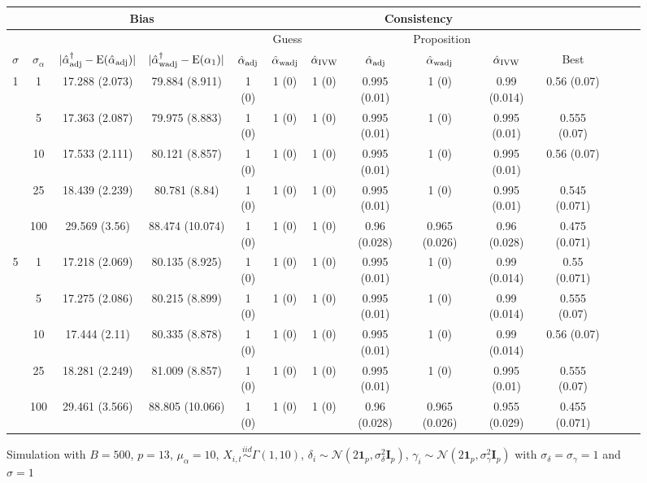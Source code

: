 \documentclass[10pt]{article}
\newcommand{\simiid}{\stackrel{iid}{\sim}} %
\def\normal#1#2{\mathcal{N}(#1,#2)} %
\def\E#1{\mathrm{E}(#1)} %
\theoremstyle{definition}
\begin{document}
\begin{sidewaysfigure}
\centering
\caption{Simulation  with $B = 500$, $p = 13$, $\mu_{\alpha}=10$, $X_{i,t} \simiid \Gamma(1,10)$, $\delta_i \sim \normal{2\mathbf{1}_p}{\sigma^2_{\delta}\mathbf{I}_p}$, $\gamma_i \sim \normal{2\mathbf{1}_p}{\sigma^2_{\gamma}\mathbf{I}_p}$ with $\sigma_{\delta}=\sigma_{\gamma}=1$ and $\sigma = 1$}
\begin{tabular}{cc|cc|ccc|ccc|ccc|c}
  & & \multicolumn{2}{c|}{Bias}  & \multicolumn{7}{c}{Consistency}  \\ 
  \hline 
   &  & & & \multicolumn{3}{|c|}{Guess} & \multicolumn{3}{|c|}{Proposition} & \\ 
 $\sigma$   & $\sigma_{\alpha}$ & $|\hat{\alpha}_{\rm adj}^{\dagger}-\E{\hat{\alpha}_{\rm adj}}|$ & $|\hat{\alpha}_{\rm wadj}^{\dagger}-\E{\alpha_1}|$ & $\hat{\alpha}_{\rm adj}$  & $\hat{\alpha}_{\rm wadj}$ & $\hat{\alpha}_{\rm IVW}$ & $\hat{\alpha}_{\rm adj}$  & $\hat{\alpha}_{\rm wadj}$ & $\hat{\alpha}_{\rm IVW}$ &  Best \\[.3cm]  
  \hline
 \multirow{5}{*}{1} & 1 & 17.288 (2.073) & 79.884 (8.911) & 1 (0) & 1 (0) & 1 (0) & 0.995 (0.01) & 1 (0) & 0.99 (0.014) & 0.56 (0.07) \\ 
 & 5 & 17.363 (2.087) & 79.975 (8.883) & 1 (0) & 1 (0) & 1 (0) & 0.995 (0.01) & 1 (0) & 0.995 (0.01) & 0.555 (0.07) \\ 
 & 10 & 17.533 (2.111) & 80.121 (8.857) & 1 (0) & 1 (0) & 1 (0) & 0.995 (0.01) & 1 (0) & 0.995 (0.01) & 0.56 (0.07) \\ 
 & 25 & 18.439 (2.239) & 80.781 (8.84) & 1 (0) & 1 (0) & 1 (0) & 0.995 (0.01) & 1 (0) & 0.995 (0.01) & 0.545 (0.071) \\ 
 & 100 & 29.569 (3.56) & 88.474 (10.074) & 1 (0) & 1 (0) & 1 (0) & 0.96 (0.028) & 0.965 (0.026) & 0.96 (0.028) & 0.475 (0.071) \\[.3cm]  
  \multirow{5}{*}{5} & 1 & 17.218 (2.069) & 80.135 (8.925) & 1 (0) & 1 (0) & 1 (0) & 0.995 (0.01) & 1 (0) & 0.99 (0.014) & 0.55 (0.071) \\ 
 & 5 & 17.275 (2.086) & 80.215 (8.899) & 1 (0) & 1 (0) & 1 (0) & 0.995 (0.01) & 1 (0) & 0.99 (0.014) & 0.555 (0.07) \\ 
  & 10 & 17.444 (2.11) & 80.335 (8.878) & 1 (0) & 1 (0) & 1 (0) & 0.995 (0.01) & 1 (0) & 0.99 (0.014) & 0.56 (0.07) \\ 
   & 25 & 18.281 (2.249) & 81.009 (8.857) & 1 (0) & 1 (0) & 1 (0) & 0.995 (0.01) & 1 (0) & 0.995 (0.01) & 0.555 (0.07) \\ 
  & 100 & 29.461 (3.566) & 88.805 (10.066) & 1 (0) & 1 (0) & 1 (0) & 0.96 (0.028) & 0.965 (0.026) & 0.955 (0.029) & 0.455 (0.071) \\[.3cm]  

\end{tabular}
\end{sidewaysfigure}
\end{document}
